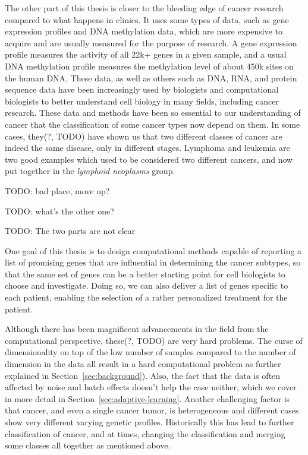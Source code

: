 The other part of this thesis is closer to the bleeding edge of cancer research
compared to what happens in clinics. It uses some types of data, such as gene
expression profiles and DNA methylation data, which are more expensive to
acquire and are usually measured for the purpose of research. A gene expression
profile measures the activity of all 22k+ genes in a given sample, and a usual
DNA methylation profile measures the methylation level of about 450k sites on
the human DNA. These data, as well as others such as DNA, RNA, and protein
sequence data have been increasingly used by biologists and computational
biologists to better understand cell biology in many fields, including cancer
research. These data and methods have been so essential to our understanding of
cancer that the classification of some cancer types now depend on them. In some
cases, they(?, TODO) have shown us that two different classes of cancer are
indeed the same disease, only in different stages. Lymphoma and leukemia are
two good examples which used to be considered two different cancers, and now
put together in the \emph{lymphoid neoplasms} group.

TODO: bad place, move up?

TODO: what's the other one?

TODO: The two parts are not clear

One goal of this thesis is to design computational methods capable of reporting
a list of promising genes that are influential in determining the cancer
subtypes, so that the same set of genes can be a better starting point for cell
biologists to choose and investigate. Doing so, we can also deliver a list of
genes specific to each patient, enabling the selection of a rather personalized
treatment for the patient.

Although there has been magnificent advancements in the field from the
computational perspective, these(?, TODO) are very hard problems. The curse of
dimensionality on top of the low number of samples compared to the number of
dimension in the data all result in a hard computational problem as further
explained in Section~\ref{sec:background}). Also, the fact that the data is
often affected by noise and batch effects doesn't help the case neither, which
we cover in more detail in Section~\ref{sec:adaptive-learning}. Another
challenging factor is that cancer, and even a single cancer tumor, is
heterogeneous and different cases show very different varying genetic profiles.
Historically this has lead to further classification of cancer, and at times,
changing the classification and merging some classes all together as mentioned
above.

